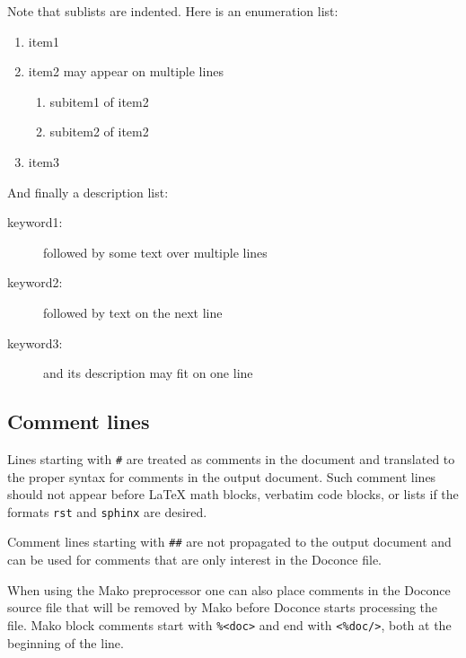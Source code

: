 \documentclass[%
oneside,                 %
final,                   %
10pt]{article}
\begin{document}
\noindent
Note that sublists are indented.
Here is an enumeration list:

\begin{enumerate}
\item item1

\item item2
   may appear on
   multiple lines
\begin{enumerate}

 \item subitem1 of item2

 \item subitem2 of item2

\end{enumerate}

\noindent
\item item3
\end{enumerate}

\noindent
And finally a description list:

\begin{description}
 \item[keyword1:] 
   followed by
   some text
   over multiple
   lines

 \item[keyword2:] 
   followed by text on the next line

 \item[keyword3:] 
   and its description may fit on one line
\end{description}

\noindent
\subsection{Comment lines}

Lines starting with \Verb!#! are treated as comments in the document and
translated to the proper syntax for comments in the output
document. Such comment lines should not appear before {\LaTeX} math
blocks, verbatim code blocks, or lists if the formats \Verb!rst! and
\Verb!sphinx! are desired.

Comment lines starting with \Verb!##! are not propagated to the output
document and can be used for comments that are only interest in
the Doconce file.

When using the Mako preprocessor one can also place comments in
the Doconce source file that will be removed by Mako before
Doconce starts processing the file. Mako block comments start
with \Verb!%
\end{document}
